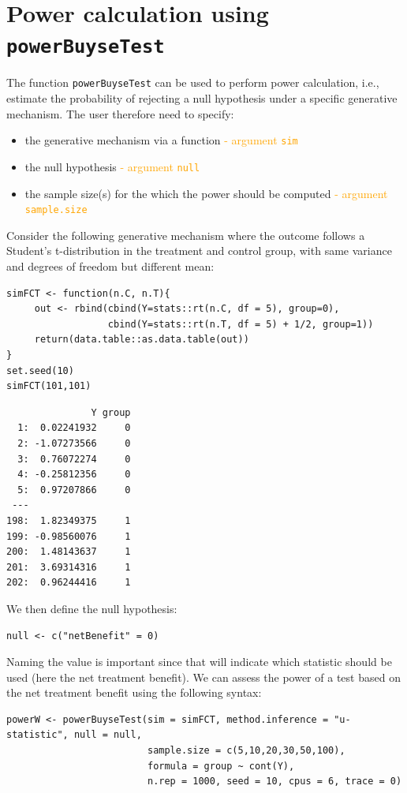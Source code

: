 \documentclass[12pt]{article}
\begin{document}
\section{Power calculation using \texttt{powerBuyseTest}}
\label{sec:org6b69fb4}

The function \texttt{powerBuyseTest} can be used to perform power
calculation, i.e., estimate the probability of rejecting a null
hypothesis under a specific generative mechanism. The user therefore
need to specify:
\begin{itemize}
\item the generative mechanism via a function \hfill \textcolor{orange}{- argument \texttt{sim}}
\item the null hypothesis \hfill \textcolor{orange}{- argument \texttt{null}}
\item the sample size(s) for the which the power should be computed  \hfill \textcolor{orange}{- argument \texttt{sample.size}}
\end{itemize}

\bigskip

Consider the following generative mechanism where the outcome follows
a Student's t-distribution in the treatment and control group, with same
variance and degrees of freedom but different mean:
\lstset{language=r,label= ,caption= ,captionpos=b,numbers=none}
\begin{lstlisting}
simFCT <- function(n.C, n.T){
     out <- rbind(cbind(Y=stats::rt(n.C, df = 5), group=0),
                  cbind(Y=stats::rt(n.T, df = 5) + 1/2, group=1))
     return(data.table::as.data.table(out))
}
set.seed(10)
simFCT(101,101)
\end{lstlisting}

\begin{verbatim}
               Y group
  1:  0.02241932     0
  2: -1.07273566     0
  3:  0.76072274     0
  4: -0.25812356     0
  5:  0.97207866     0
 ---                  
198:  1.82349375     1
199: -0.98560076     1
200:  1.48143637     1
201:  3.69314316     1
202:  0.96244416     1
\end{verbatim}

We then define the null hypothesis:
\lstset{language=r,label= ,caption= ,captionpos=b,numbers=none}
\begin{lstlisting}
null <- c("netBenefit" = 0)
\end{lstlisting}

Naming the value is important since that will indicate which statistic
should be used (here the net treatment benefit). We can assess the power of a
test based on the net treatment benefit using the following syntax:
\lstset{language=r,label= ,caption= ,captionpos=b,numbers=none}
\begin{lstlisting}
powerW <- powerBuyseTest(sim = simFCT, method.inference = "u-statistic", null = null,
                         sample.size = c(5,10,20,30,50,100),                         
                         formula = group ~ cont(Y), 
                         n.rep = 1000, seed = 10, cpus = 6, trace = 0)
\end{lstlisting}
\end{document}
